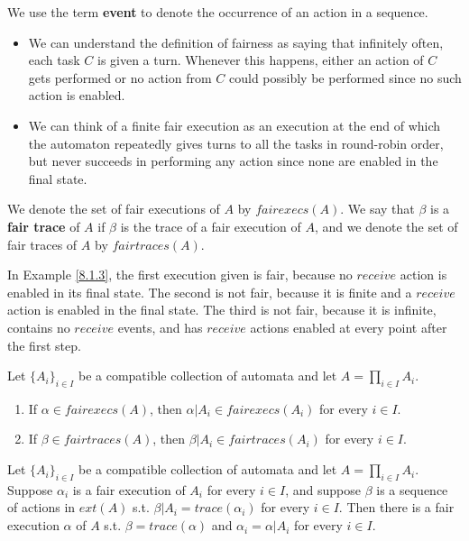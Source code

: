 \documentclass[11pt]{article}
\begin{document}
We use the term \textbf{event} to denote the occurrence of an action in a sequence.

\begin{itemize}
\item We can understand the definition of fairness as saying that infinitely often, each task \(C\) is
given a turn. Whenever this happens, either an action of \(C\) gets performed or no action from
\(C\) could possibly be performed since no such action is enabled.
\item We can think of a finite fair execution as an execution at the end of which the automaton
repeatedly gives turns to all the tasks in round-robin order, but never succeeds in performing any
action since none are enabled in the final state. \label{P1}
\end{itemize}

We denote the set of fair executions of \(A\) by \(fairexecs(A)\). We say that \(\beta\) is a \textbf{fair
trace} of \(A\) if \(\beta\) is the trace of a fair execution of \(A\), and we denote the set of fair
traces of \(A\) by \(fairtraces(A)\).

\begin{examplle}[Fairness]
In Example \ref{8.1.3}, the first execution given is fair, because no \(receive\) action is enabled in
its final state. The second is not fair, because it is finite and a \(receive\) action is enabled in
the final state. The third is not fair, because it is infinite, contains no \(receive\) events, and
has \(receive\) actions enabled at every point after the first step.
\end{examplle}

\begin{theorem}[]
Let \(\{A_i\}_{i\in I}\) be a compatible collection of automata and let \(A=\prod_{i\in I}A_i\).
\begin{enumerate}
\item If \(\alpha\in fairexecs(A)\), then \(\alpha|A_i\in fairexecs(A_i)\) for every \(i\in I\).
\item If \(\beta\in fairtraces(A)\), then \(\beta|A_i\in fairtraces(A_i)\) for every \(i\in I\).
\end{enumerate}
\end{theorem}

\begin{theorem}[]
Let \(\{A_i\}_{i\in I}\) be a compatible collection of automata and let \(A=\prod_{i\in I}A_i\).
Suppose \(\alpha_i\) is a fair execution of \(A_i\) for every \(i\in I\), and suppose \(\beta\) is a
sequence of actions in \(ext(A)\) s.t. \(\beta|A_i=trace(\alpha_i)\) for every \(i\in I\). Then there
is a fair execution \(\alpha\) of \(A\) s.t. \(\beta=trace(\alpha)\) and \(\alpha_i=\alpha|A_i\) for
every \(i\in I\).
\end{theorem}
\end{document}
